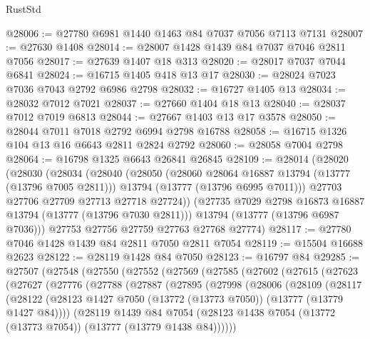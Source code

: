\begin{lexlean}{RustStd}
\begin{coremodule}
@28006 := @27780 @6981 @1440 @1463 @84 @7037 @7056 @7113 @7131
@28007 := @27630 @1408
@28014 := @28007 @1428 @1439 @84 @7037 @7046 @2811 @7056
@28017 := @27639 @1407 @18 @313
@28020 := @28017 @7037 @7044 @6841
@28024 := @16715 @1405 @418 @13 @17
@28030 := @28024 @7023 @7036 @7043 @2792 @6986 @2798
@28032 := @16727 @1405 @13
@28034 := @28032 @7012 @7021
@28037 := @27660 @1404 @18 @13
@28040 := @28037 @7012 @7019 @6813
@28044 := @27667 @1403 @13 @17 @3578
@28050 := @28044 @7011 @7018 @2792 @6994 @2798 @16788
@28058 := @16715 @1326 @104 @13 @16 @6643 @2811 @2824 @2792
@28060 := @28058 @7004 @2798
@28064 := @16798 @1325 @6643 @26841 @26845
@28109 := @28014
    (@28020
      (@28030
        (@28034
          (@28040
            (@28050
              (@28060 @28064 @16887 @13794 (@13777 (@13796 @7005 @2811)))
              @13794
              (@13777 (@13796 @6995 @7011)))
            @27703
            @27706
            @27709
            @27713
            @27718
            @27724))
        (@27735 @7029 @2798 @16873 @16887 @13794 (@13777 (@13796 @7030 @2811)))
        @13794
        (@13777 (@13796 @6987 @7036)))
      @27753
      @27756
      @27759
      @27763
      @27768
      @27774)
@28117 := @27780 @7046 @1428 @1439 @84 @2811 @7050 @2811 @7054
@28119 := @15504 @16688 @2623
@28122 := @28119 @1428 @84 @7050
@28123 := @16797 @84
@29285 := @27507
    (@27548
      (@27550
        (@27552
          (@27569
            (@27585
              (@27602
                (@27615
                  (@27623
                    (@27627
                      (@27776
                        (@27788
                          (@27887
                            (@27895
                              (@27998
                                (@28006
                                  (@28109
                                    (@28117
                                      (@28122
                                        (@28123
                                          @1427
                                          @7050
                                          (@13772 (@13773 @7050))
                                          (@13777 (@13779 @1427 @84))))
                                      (@28119
                                        @1439
                                        @84
                                        @7054
                                        (@28123
                                          @1438
                                          @7054
                                          (@13772 (@13773 @7054))
                                          (@13777 (@13779 @1438 @84))))))

\end{coremodule}
\end{lexlean}
